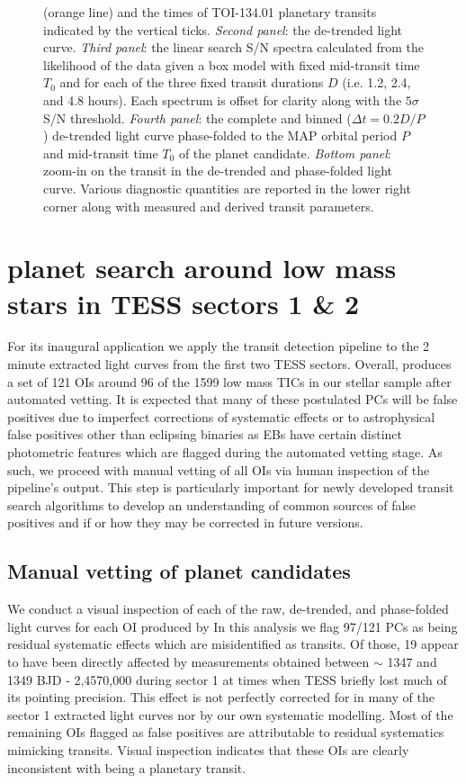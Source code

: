 \begin{figure}
{    (orange line) and the
    times of TOI-134.01 planetary transits indicated by the vertical ticks. \emph{Second panel}: the
    de-trended light curve. \emph{Third panel}: the linear search S/N spectra calculated
    from the likelihood of the data given a box model with fixed mid-transit time $T_0$ and for
    each of the three fixed transit durations $D$ (i.e. 1.2, 2.4, and 4.8 hours).
    Each spectrum is offset for clarity along with the $5\sigma$ S/N threshold.
    \emph{Fourth panel}: the complete and binned ($\Delta t = 0.2D/P$) de-trended light curve
    phase-folded to the MAP orbital period $P$ and mid-transit time $T_0$ of the planet candidate.
    \emph{Bottom panel}: zoom-in on the transit in the de-trended and phase-folded light curve.
    Various diagnostic quantities are reported in the lower right corner along with measured
    and derived transit parameters.}
  \label{fig:summary}
\end{figure}


\section{\pipeline{} planet search around low mass stars in TESS sectors 1 \& 2} \label{sect:search}
For its inaugural application we apply the \pipeline{} transit detection pipeline to the
2 minute extracted light curves from the first two TESS sectors. 
Overall, \pipeline{} produces a set of 121 OIs around 96 of the 1599 low mass TICs in our stellar
sample after automated vetting.
It is expected that many of these postulated PCs will be false positives due to
imperfect corrections of systematic effects or to astrophysical false positives other than eclipsing
binaries as EBs have certain distinct photometric features which are flagged during the automated 
vetting stage. As such, we proceed with manual vetting of all \pipeline{} OIs via human inspection
of the pipeline's output. This step is particularly important for newly developed transit
search algorithms to develop an understanding of common sources of false positives and if or how
they may be corrected in future versions.

\subsection{Manual vetting of \pipeline{} planet candidates} \label{sect:manual}
We conduct a visual inspection of each of the raw, de-trended, and phase-folded light curves for
each OI produced by  
In this analysis we flag 97/121 PCs as being residual systematic effects which are
misidentified as transits. Of those, 19 appear to have been directly affected by measurements
obtained between $\sim$ 1347 and 1349 BJD - 2,4570,000 during sector 1 at times when TESS briefly lost much
of its pointing precision. This effect is not perfectly corrected for in many of the sector 1 extracted light
curves nor by our own systematic modelling. Most of the remaining OIs flagged as false positives are attributable
to residual systematics mimicking transits. Visual inspection indicates that these OIs are clearly
inconsistent with being a planetary transit.

